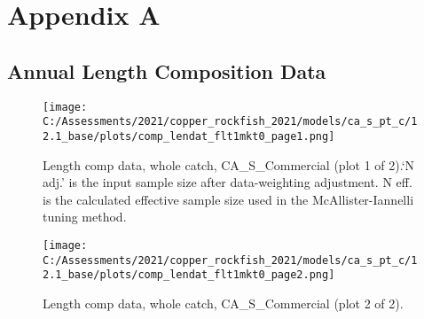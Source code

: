 \documentclass[11pt,
  english,
  a4paper,
]{article}
\begin{document}
\tagmcend\tagstructend

\clearpage


\hypertarget{appendix-a}{%
\section{Appendix A}\label{appendix-a}}

\leavevmode\tagmcend\tagstructend


\hypertarget{length-data}{%
\subsection{Annual Length Composition Data}\label{length-data}}

\leavevmode\tagmcend\tagstructend


\begin{figure}
\centering
\texttt{[image: C:/Assessments/2021/copper\_rockfish\_2021/models/ca\_s\_pt\_c/12.1\_base/plots/comp\_lendat\_flt1mkt0\_page1.png]}
\caption{Length comp data, whole catch, CA\_S\_Commercial (plot 1 of 2).`N adj.' is the input sample size after data-weighting adjustment. N eff. is the calculated effective sample size used in the McAllister-Iannelli tuning method.\label{fig:comp_lendat_flt1mkt0_page1}}
\end{figure}

\tagmcend\tagstructend


\begin{figure}
\centering
\texttt{[image: C:/Assessments/2021/copper\_rockfish\_2021/models/ca\_s\_pt\_c/12.1\_base/plots/comp\_lendat\_flt1mkt0\_page2.png]}
\caption{Length comp data, whole catch, CA\_S\_Commercial (plot 2 of 2).\label{fig:comp_lendat_flt1mkt0_page2}}
\end{figure}

\tagmcend\tagstructend
\end{document}
